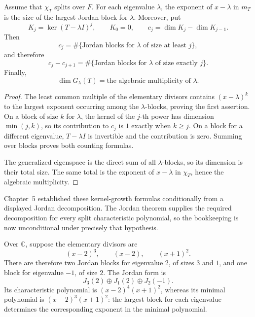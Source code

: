\begin{corollary}
\label{cor:jordan-kernel-growth}
Assume that \(\chi_T\) splits over \(F\). For each eigenvalue \(\lambda\),
the exponent of \(x-\lambda\) in \(m_T\)
is the size of the largest Jordan block for \(\lambda\). Moreover, put
\[
K_j=\ker(T-\lambda I)^j,
\qquad K_0=0,
\qquad c_j=\dim K_j-\dim K_{j-1}.
\]
Then
\[
c_j=\#\{\text{Jordan blocks for \(\lambda\) of size at least \(j\)}\},
\]
and therefore
\[
c_j-c_{j+1}
=\#\{\text{Jordan blocks for \(\lambda\) of size exactly \(j\)}\}.
\]
Finally,
\[
\dim G_\lambda(T)=
\text{the algebraic multiplicity of \(\lambda\)}.
\]
\end{corollary}
\begin{proof}
The least common multiple of the elementary divisors contains
\((x-\lambda)^k\) to the largest exponent occurring among the
\(\lambda\)-blocks, proving the first assertion. On a block of size \(k\)
for \(\lambda\), the kernel of the \(j\)-th power has dimension
\(\min(j,k)\), so its contribution to \(c_j\) is \(1\) exactly when
\(k\geq j\). On a block for a different eigenvalue, \(T-\lambda I\) is
invertible and the contribution is zero. Summing over blocks proves both
counting formulas.

The generalized eigenspace is the direct sum of all \(\lambda\)-blocks, so
its dimension is their total size. The same total is the exponent of
\(x-\lambda\) in \(\chi_T\), hence the algebraic multiplicity.
\end{proof}

Chapter~5 established these kernel-growth formulas conditionally from a
displayed Jordan decomposition. The Jordan theorem supplies the required
decomposition for every split characteristic polynomial, so the bookkeeping
is now unconditional under precisely that hypothesis.

\begin{example}
Over \(\mathbb C\), suppose the elementary divisors are
\[(x-2)^3,\qquad (x-2),\qquad (x+1)^2.\]
There are therefore two Jordan blocks for eigenvalue \(2\), of sizes \(3\)
and \(1\), and one block for eigenvalue \(-1\), of size \(2\). The Jordan
form is
\[J_3(2)\oplus J_1(2)\oplus J_2(-1).\]
Its characteristic polynomial is \((x-2)^4(x+1)^2\), whereas its minimal
polynomial is \((x-2)^3(x+1)^2\): the largest block for each eigenvalue
determines the corresponding exponent in the minimal polynomial.
\end{example}

